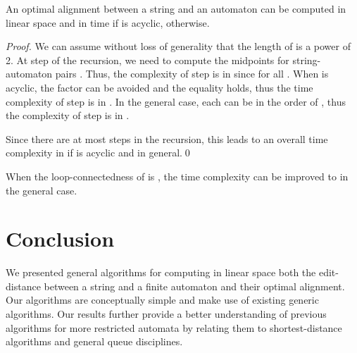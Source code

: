 \documentclass{llncs}
\newcommand{\0}{\overline{0}}
\newcommand{\1}{\overline{1}}
\newcommand{\+}{\oplus}
\renewcommand{\.}{\otimes}
\begin{document}
\begin{theorem}
  An optimal alignment between a string  and an automaton  can
  be computed in linear space  and in time 
  if  is acyclic,  otherwise.
\end{theorem}
\begin{proof}
  We can assume without loss of generality that the length of  is a
  power of 2.  At step  of the recursion, we need to compute the
  midpoints for  string-automaton pairs . Thus, the complexity of step  is in
   since
   for all .  When  is acyclic, the 
  factor can be avoided and the equality  holds, thus the time complexity of step  is in
  . In the general case, each  can be in the
  order of , thus the complexity of step  is in .

  Since there are at most  steps in the recursion, this
  leads to an overall time complexity in  if  is
  acyclic and  in general.\qed
\end{proof}
When the loop-connectedness of  is , the time complexity can
be improved to  in the general case.

\section{Conclusion}

We presented general algorithms for computing in linear space both the
edit-distance between a string and a finite automaton and their
optimal alignment. Our algorithms are conceptually simple and make use
of existing generic algorithms. Our results further provide a better
understanding of previous algorithms for more restricted automata by
relating them to shortest-distance algorithms and general queue
disciplines.



\end{document}
